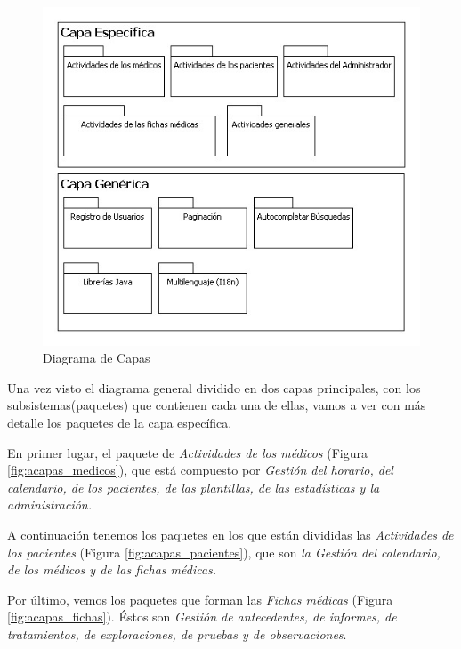 	\begin{figure}[H]
	  \centering
	    \includegraphics[width=13cm]{img/jpg/acapas/capas.jpg}
	  \caption{Diagrama de Capas}
	  \label{fig:acapas}
	\end{figure}
	
	Una vez visto el diagrama general dividido en dos capas principales, con los subsistemas(paquetes) que contienen cada una de ellas, vamos a ver con más detalle los paquetes de la capa específica.
	
	En primer lugar, el paquete de \textit{Actividades de los médicos} (Figura \ref{fig:acapas_medicos}), que está compuesto por \textit{Gestión del horario, del calendario, de los pacientes, de las plantillas, de las estadísticas y la administración.}
	
	A continuación tenemos los paquetes en los que están divididas las \textit{Actividades de los pacientes} (Figura \ref{fig:acapas_pacientes}), que son \textit{la Gestión del calendario, de los médicos y de las fichas médicas.}
	
	Por último, vemos los paquetes que forman las \textit{Fichas médicas} (Figura \ref{fig:acapas_fichas}). Éstos son \textit{Gestión de antecedentes, de informes, de tratamientos, de exploraciones, de pruebas y de observaciones}.
	
